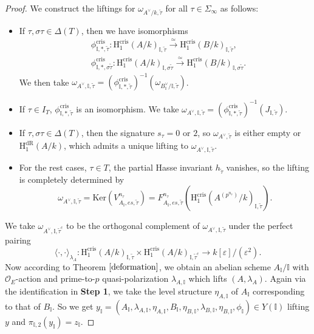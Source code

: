 \documentclass{article}
\begin{document}
\begin{proof}
We construct the liftings for $\omega_{A^\vee/k,\tilde\tau}$ for all $\tau\in\Sigma_{\infty}$ as follows:
\begin{itemize}
	\item If $\tau,\sigma\tau\in\Delta(T)$, then we have isomorphisms
\begin{equation}
\begin{aligned}
&\phi_{\mathbb{I},\ast,\tilde\tau}^{\text{cris}}:\text{H}_1^{\text{cris}}(A/k)_{\mathbb{I},\tilde\tau}\xrightarrow{\simeq} \text{H}^{\text{cris}}_1(B/k)_{\mathbb{I},\tilde\tau},\\
&\phi_{\mathbb{I},\ast,\sigma\tilde\tau}^{\text{cris}}:\text{H}_1^{\text{cris}}(A/k)_{\mathbb{I},\sigma\tilde\tau}\xrightarrow{\simeq} \text{H}^{\text{cris}}_1(B/k)_{\mathbb{I},\sigma\tilde\tau}.
\end{aligned}
\end{equation}
We then take $\omega_{A^\vee,\mathbb{I},\tilde\tau}=(\phi^{\text{cris}}_{\mathbb{I},\ast,\tilde\tau})^{-1}(\omega_{B^\vee_{\mathbb{I}}/\mathbb{I},\tilde\tau})$.
	\item If $\tau\in I_T$, $\phi_{\mathbb{I},\ast,\tilde\tau}^{\text{cris}}$ is an isomorphism. We take $\omega_{A^\vee,\mathbb{I},\tilde\tau}=(\phi^{\text{cris}}_{\mathbb{I},\ast,\tilde\tau})^{-1}(J_{\mathbb{I},\tilde\tau})$.
	\item If $\tau,\sigma\tau\in \Delta(T)$, then the signature $s_\tau=0$ or $2$, so $\omega_{A^\vee,\tilde\tau}$ is either empty or $\text{H}_1^{\text{dR}}(A/k)$, which admits a unique lifting to $\omega_{A^\vee,{\mathbb{I}},\tilde\tau}$.
	\item For the rest cases, $\tau\in T$, the partial Hasse invariant $h_{\tilde\tau}$ vanishes, so the lifting is completely determined by
\begin{equation}
\omega_{A^\vee,\mathbb{I},\tilde\tau}=\text{Ker}(V^{n_\tau}_{A_\mathbb{I},es,\tilde\tau})=F^{n_\tau}_{A_{\mathbb{I}},es,\tilde\tau}(\text{H}_1^{\text{cris}}(A^{(p^{n_\tau})}/k)_{\mathbb{I},\tilde\tau}).
\end{equation}
\end{itemize}
We take $\omega_{A^\vee,\mathbb{I},\tilde\tau^c}$ to be the orthogonal complement of $\omega_{A^\vee,\mathbb{I},\tilde\tau}$ under the perfect pairing
\begin{equation}
\langle\cdot,\cdot\rangle_{\lambda_A}:\text{H}_1^{\text{cris}}(A/k)_{\mathbb{I},\tilde\tau}\times \text{H}_1^{\text{cris}}(A/k)_{\mathbb{I},\tilde\tau^c}\to k[\varepsilon]/(\varepsilon^2).
\end{equation}
Now according to Theorem $\ref{deformation}$, we obtain an abelian scheme $A_{\mathbb{I}}/\mathbb{I}$ with $\mathcal{O}_E$-action and prime-to-$p$ quasi-polarization $\lambda_{A,\mathbb{I}}$ which lifts $(A,\lambda_A)$. Again via the identification in \textbf{Step 1}, we take the level structure $\eta_{A,\mathbb{I}}$ of $A_{\mathbb{I}}$ corresponding to that of $B_{\mathbb{I}}$. So we get $y_{\mathbb{I}}=(A_{\mathbb{I}},\lambda_{A,\mathbb{I}},\eta_{A,\mathbb{I}},B_{\mathbb{I}},\eta_{B,\mathbb{I}},\lambda_{B,\mathbb{I}},\eta_{B,\mathbb{I}},\phi_{\mathbb{I}})\in Y(\mathbb{I})$ lifting $y$ and $\pi_{\mathbb{I},2}(y_{\mathbb{I}})=z_{\mathbb{I}}$.




\end{proof}
\end{document}
